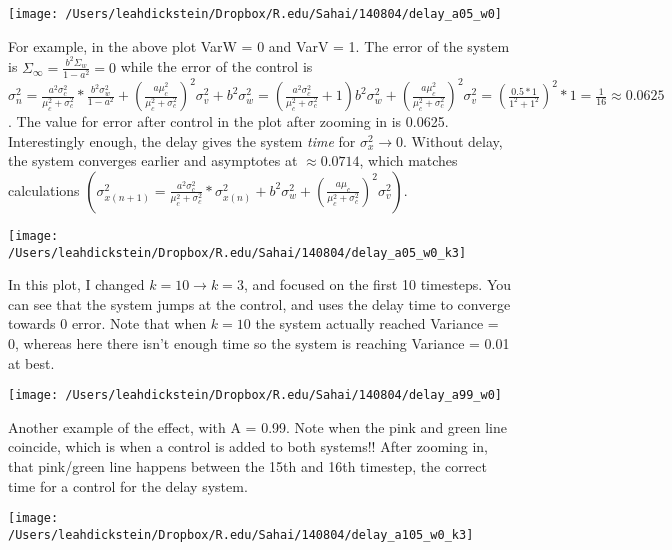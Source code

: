 \documentclass[leqno,twocolumn]{article}
\begin{document}
\begin{center}
\texttt{[image: /Users/leahdickstein/Dropbox/R.edu/Sahai/140804/delay\_a05\_w0]}\end{center}

For example, in the above plot VarW = 0 and VarV = 1. The error of the system is $\Sigma_\infty = \frac{b^2\Sigma_w}{1-a^2} = 0$ while the error of the control is $\sigma^2_{n} = \frac{a^2\sigma_c^2}{\mu_c^2+\sigma_c^2} * \frac{b^2\sigma_w^2}{1-a^2} + \left(\frac{a\mu_c^2}{\mu_c^2+\sigma_c^2}\right)^2\sigma_v^2 + b^2\sigma_w^2 = \left(\frac{a^2\sigma_c^2}{\mu_c^2+\sigma_c^2} + 1 \right)b^2\sigma_w^2 + \left(\frac{a\mu_c^2}{\mu_c^2+\sigma_c^2}\right)^2\sigma_v^2 = \left(\frac{0.5*1}{1^2+1^2}\right)^2*1 = \frac{1}{16} \approx 0.0625$. The value for error after control in the plot after zooming in is 0.0625. Interestingly enough, the delay gives the system \textit{time} for $\sigma_x^2 \rightarrow 0$. Without delay, the system converges earlier and asymptotes at $\approx 0.0714$, which matches calculations $\left( \sigma_{x(n+1)}^2 = \frac{a^2\sigma_c^2}{\mu_c^2+\sigma_c^2} * \sigma_{x(n)}^2 + b^2\sigma_w^2 + \left(\frac{a\mu_c}{\mu_c^2+\sigma_c^2}\right)^2\sigma_v^2 \right)$.

\begin{center}
\texttt{[image: /Users/leahdickstein/Dropbox/R.edu/Sahai/140804/delay\_a05\_w0\_k3]}\end{center}

In this plot, I changed $k = 10 \rightarrow k = 3$, and focused on the first 10 timesteps. You can see that the system jumps at the control, and uses the delay time to converge towards 0 error. Note that when $k = 10$ the system actually reached Variance = 0, whereas here there isn't enough time so the system is reaching Variance = 0.01 at best.

\begin{center}
\texttt{[image: /Users/leahdickstein/Dropbox/R.edu/Sahai/140804/delay\_a99\_w0]}\end{center}

Another example of the effect, with A = 0.99. Note when the pink and green line coincide, which is when a control is added to both systems!! After zooming in, that pink/green line happens between the 15th and 16th timestep, the correct time for a control for the delay system.

\begin{center}
\texttt{[image: /Users/leahdickstein/Dropbox/R.edu/Sahai/140804/delay\_a105\_w0\_k3]}\end{center}
\end{document}
